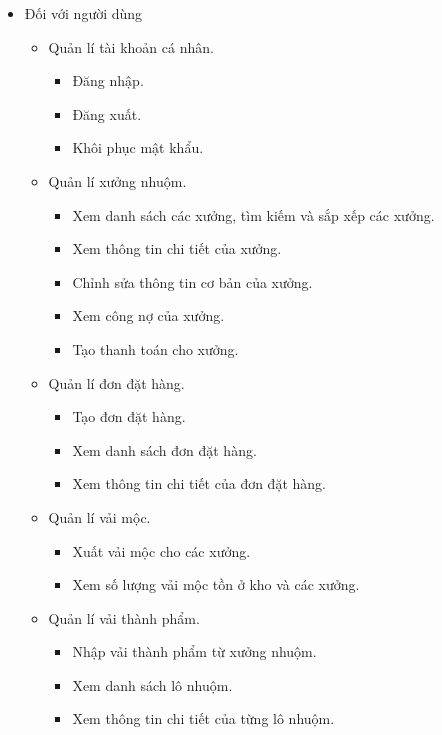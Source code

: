 \begin{itemize}
    \item Đối với người dùng
    \begin{itemize}
        \item Quản lí tài khoản cá nhân.
        \begin{itemize}
            \item Đăng nhập.
            \item Đăng xuất.
            \item Khôi phục mật khẩu.
        \end{itemize}
        \item Quản lí xưởng nhuộm.
        \begin{itemize}
            \item Xem danh sách các xưởng, tìm kiếm và sắp xếp các xưởng.
            \item Xem thông tin chi tiết của xưởng.
            \item Chỉnh sửa thông tin cơ bản của xưởng.
            \item Xem công nợ của xưởng.
            \item Tạo thanh toán cho xưởng.
        \end{itemize}
        \item Quản lí đơn đặt hàng.
        \begin{itemize}
            \item Tạo đơn đặt hàng.
            \item Xem danh sách đơn đặt hàng.
            \item Xem thông tin chi tiết của đơn đặt hàng.
        \end{itemize}
        \item Quản lí vải mộc.
        \begin{itemize}
            \item Xuất vải mộc cho các xưởng.
            \item Xem số lượng vải mộc tồn ở kho và các xưởng.
        \end{itemize}
        \item Quản lí vải thành phẩm.
        \begin{itemize}
            \item Nhập vải thành phẩm từ xưởng nhuộm.
            \item Xem danh sách lô nhuộm.
            \item Xem thông tin chi tiết của từng lô nhuộm.
        \end{itemize}

\end{itemize}
\end{itemize}
